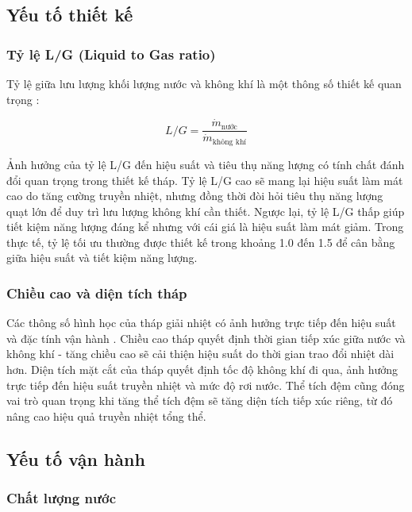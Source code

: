 \documentclass[../main.tex]{subfiles}
\begin{document}
\subsection{Yếu tố thiết kế}
\label{sec:design_factors}

\subsubsection{Tỷ lệ L/G (Liquid to Gas ratio)}
Tỷ lệ giữa lưu lượng khối lượng nước và không khí là một thông số thiết kế quan trọng \cite{marriott_practical_thermal_2009}:

\begin{equation}
    L/G = \frac{\dot{m}_{\text{nước}}}{\dot{m}_{\text{không khí}}}
\end{equation}

Ảnh hưởng của tỷ lệ L/G đến hiệu suất và tiêu thụ năng lượng có tính chất đánh đổi quan trọng trong thiết kế tháp. Tỷ lệ L/G cao sẽ mang lại hiệu suất làm mát cao do tăng cường truyền nhiệt, nhưng đồng thời đòi hỏi tiêu thụ năng lượng quạt lớn để duy trì lưu lượng không khí cần thiết. Ngược lại, tỷ lệ L/G thấp giúp tiết kiệm năng lượng đáng kể nhưng với cái giá là hiệu suất làm mát giảm. Trong thực tế, tỷ lệ tối ưu thường được thiết kế trong khoảng 1.0 đến 1.5 để cân bằng giữa hiệu suất và tiết kiệm năng lượng.

\subsubsection{Chiều cao và diện tích tháp}
Các thông số hình học của tháp giải nhiệt có ảnh hưởng trực tiếp đến hiệu suất và đặc tính vận hành \cite{cti_cooling_towers_2011}. Chiều cao tháp quyết định thời gian tiếp xúc giữa nước và không khí - tăng chiều cao sẽ cải thiện hiệu suất do thời gian trao đổi nhiệt dài hơn. Diện tích mặt cắt của tháp quyết định tốc độ không khí đi qua, ảnh hưởng trực tiếp đến hiệu suất truyền nhiệt và mức độ rơi nước. Thể tích đệm cũng đóng vai trò quan trọng khi tăng thể tích đệm sẽ tăng diện tích tiếp xúc riêng, từ đó nâng cao hiệu quả truyền nhiệt tổng thể.

\subsection{Yếu tố vận hành}
\label{sec:operational_factors}

\subsubsection{Chất lượng nước}
\label{sec:water_quality}
\end{document}
